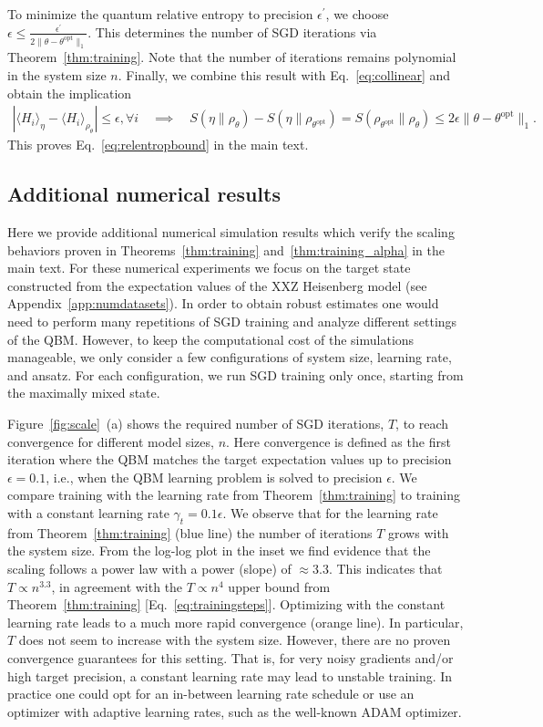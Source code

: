 \documentclass[
    aps,
    prx,
    onecolumn
]{revtex4-2}
\begin{document}
To minimize the quantum relative entropy to precision $\epsilon^\prime$, we choose $\epsilon \leq \frac{\epsilon^\prime}{ 2 \| \theta - \theta^\textrm{opt} \|_1 }$. This determines the number of SGD iterations via Theorem~\ref{thm:training}. Note that the number of iterations remains polynomial in the system size $n$. Finally, we combine this result with Eq.~\eqref{eq:collinear} and obtain the implication
\begin{align}
    |\langle H_{i}\rangle_\eta -\langle H_{i} \rangle_{\rho_\theta} | \leq \epsilon, \forall i \quad \implies \quad S(\eta \| \rho_{\theta}) - S(\eta \| \rho_{\theta^\mathrm{opt}}) = S(\rho_{\theta^\mathrm{opt}} \| \rho_{\theta}) \leq 2 \epsilon \| \theta - \theta^\textrm{opt} \|_1 .
\end{align} 
This proves Eq.~\eqref{eq:relentropbound} in the main text. 

\subsection{Additional numerical results}
\label{app:extranumdata}
Here we provide additional numerical simulation results which verify the scaling behaviors proven in Theorems~\ref{thm:training} and~\ref{thm:training_alpha} in the main text. For these numerical experiments we focus on the target state constructed from the expectation values of the XXZ Heisenberg model (see Appendix~\ref{app:numdatasets}). In order to obtain robust estimates one would need to perform many repetitions of SGD training and analyze different settings of the QBM. However, to keep the computational cost of the simulations manageable, we only consider a few configurations of system size, learning rate, and ansatz. For each configuration, we run SGD training only once, starting from the maximally mixed state.

Figure~\ref{fig:scale}~(a) shows the required number of SGD iterations, $T$, to reach convergence for different model sizes, $n$. Here convergence is defined as the first iteration where the QBM matches the target expectation values up to precision $\epsilon=0.1$, i.e., when the QBM learning problem is solved to precision $\epsilon$. We compare training with the learning rate from Theorem~\ref{thm:training} to training with a constant learning rate $\gamma_t=0.1\epsilon$. We observe that for the learning rate from Theorem~\ref{thm:training} (blue line) the number of iterations $T$ grows with the system size. From the log-log plot in the inset we find evidence that the scaling follows a power law with a power (slope) of $\approx3.3$. This indicates that $T\propto n^{3.3}$, in agreement with the $T\propto n^4$ upper bound from Theorem~\ref{thm:training} [Eq.~\eqref{eq:trainingsteps}]. Optimizing with the constant learning rate leads to a much more rapid convergence (orange line). In particular, $T$ does not seem to increase with the system size. However, there are no proven convergence guarantees for this setting. That is, for very noisy gradients and/or high target precision, a constant learning rate may lead to unstable training. In practice one could opt for an in-between learning rate schedule or use an optimizer with adaptive learning rates, such as the well-known ADAM optimizer. 
\end{document}
